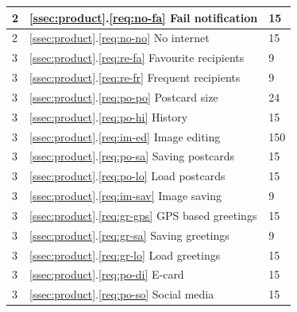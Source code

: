 \documentclass[10pt,a4paper]{article}
\begin{document}
\begin{table}[h!]
\begin{tabular}{| l | l | l | }
2 & \ref{ssec:product}.\ref{req:no-fa} Fail notification & 15\\ \hline
2 & \ref{ssec:product}.\ref{req:no-no} No internet & 15\\ \hline
3 & \ref{ssec:product}.\ref{req:re-fa} Favourite recipients & 9\\ \hline
3 & \ref{ssec:product}.\ref{req:re-fr} Frequent recipients & 9\\ \hline
3 & \ref{ssec:product}.\ref{req:po-po} Postcard size & 24\\ \hline
3 & \ref{ssec:product}.\ref{req:po-hi} History & 15\\ \hline
3 & \ref{ssec:product}.\ref{req:im-ed} Image editing & 150\\ \hline
3 & \ref{ssec:product}.\ref{req:po-sa} Saving postcards & 15\\ \hline
3 & \ref{ssec:product}.\ref{req:po-lo} Load postcards & 15\\ \hline
3 & \ref{ssec:product}.\ref{req:im-sav} Image saving & 9\\ \hline
3 & \ref{ssec:product}.\ref{req:gr-gps} GPS based greetings &15\\ \hline
3 & \ref{ssec:product}.\ref{req:gr-sa} Saving greetings & 9\\ \hline
3 & \ref{ssec:product}.\ref{req:gr-lo} Load greetings & 15\\ \hline
3 & \ref{ssec:product}.\ref{req:po-di} E-card &15\\ \hline
3 & \ref{ssec:product}.\ref{req:po-so} Social media &15\\ \hline
\end{tabular}\\
\end{table}

\end{document}

